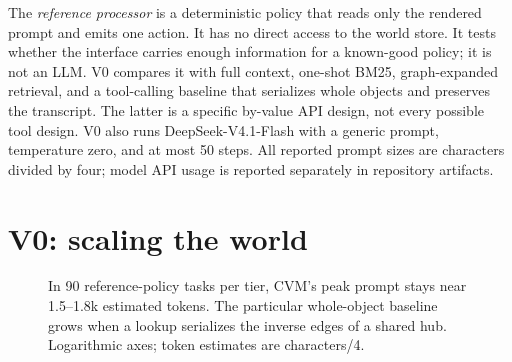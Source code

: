 \documentclass[10pt,letterpaper]{article}
\begin{document}
The \emph{reference processor} is a deterministic policy that reads only the rendered prompt and emits one action. It has no direct access to the world store. It tests whether the interface carries enough information for a known-good policy; it is not an LLM. V0 compares it with full context, one-shot BM25, graph-expanded retrieval, and a tool-calling baseline that serializes whole objects and preserves the transcript. The latter is a specific by-value API design, not every possible tool design. V0 also runs DeepSeek-V4.1-Flash with a generic prompt, temperature zero, and at most 50 steps. All reported prompt sizes are characters divided by four; model API usage is reported separately in repository artifacts.

\section{V0: scaling the world}

\begin{figure}[t]
\centering
{}
\caption{In 90 reference-policy tasks per tier, CVM's peak prompt stays near 1.5--1.8k estimated tokens. The particular whole-object baseline grows when a lookup serializes the inverse edges of a shared hub. Logarithmic axes; token estimates are characters/4.}
\label{fig:scale}
\end{figure}
\end{document}
